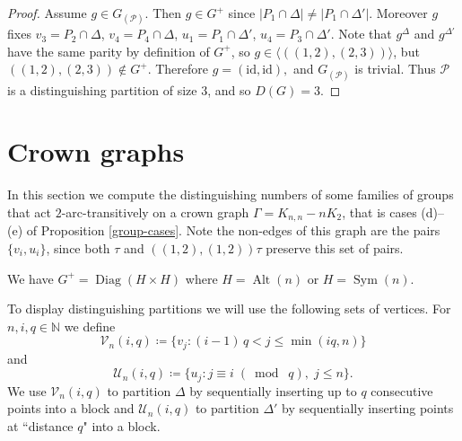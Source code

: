 \documentclass[11pt]{amsart}
\DeclareMathOperator{\Sym}{Sym}
\DeclareMathOperator{\Alt}{Alt}
\DeclareMathOperator{\Diag}{Diag}
\begin{document}
\begin{proof}
Assume \(g\in G_{(\mathcal{P})}\). Then $g\in G^+$ since $|P_1\cap \Delta|\neq |P_1\cap \Delta'|$. 
Moreover $g$ fixes $v_3=P_2\cap \Delta$, $v_4=P_4\cap \Delta$, $u_1=P_1\cap \Delta'$, $u_4=P_3\cap \Delta'$.
Note that $g^\Delta$ and $g^{\Delta'}$ have the same parity by definition of $G^+$, so $g\in\langle ((1,2),(2,3))\rangle$, but $((1,2),(2,3))\notin G^+$. Therefore  $g=(\mathrm{id},\mathrm{id}),$ and  $G_{(\mathcal{P})}$ is trivial.  Thus $\mathcal{P}$ is a distinguishing partition of size $3$, and so $D(G)=3.$


\end{proof}




\section{Crown graphs}

In this section we compute the distinguishing numbers of some families of groups that act $2$-arc-transitively on a crown graph $\Gamma=K_{n,n}-nK_2$, that is  cases (d)--(e) of Proposition \ref{group-cases}. 
Note the non-edges of this graph are the pairs $\{v_i,u_i\}$, since both $\tau$ and $((1,2),(1,2))\tau$ preserve this set of pairs.


We have  $G^+=  \Diag(H\times H)$ where $H=\Alt(n)$ or $H=\Sym(n)$. 


\medskip
To display distinguishing partitions we will use the following  sets of vertices.
For \(n, i, q \in \mathbb{N}\) we define 
 \begin{equation*}
\mathcal{V}_n(i,q)\coloneqq\{v_{j}: (i-1)\,q < j \leqslant \min(iq,n)\}
 \end{equation*}
and
 \begin{equation*}
\mathcal{U}_n(i,q)\coloneqq\{u_{j}: j \equiv i \;(\bmod\; q),\; j\leqslant n\}.
 \end{equation*}
 We use \(\mathcal{V}_n(i, q)\) to partition \(\Delta\) by sequentially inserting up to \(q\) consecutive points into a block and \(\mathcal{U}_n(i, q)\) to partition \(\Delta'\) by sequentially inserting points at ``distance \(q\)" into a block.

\end{document}
